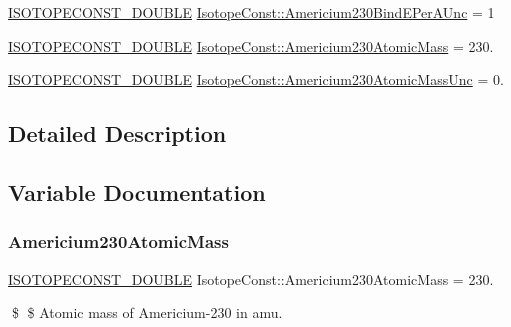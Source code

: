 \begin{DoxyCompactItemize}
\mbox{\hyperlink{group___isotope_const-_macros_ga8f45a7272ce02c0b4c65c44636ed719a}{I\+S\+O\+T\+O\+P\+E\+C\+O\+N\+S\+T\+\_\+\+D\+O\+U\+B\+LE}} \mbox{\hyperlink{group___isotope_const-_americium-_am230_gafda9f33ae4a0af129bb4cdbe074f6c0a}{Isotope\+Const\+::\+Americium230\+Bind\+E\+Per\+A\+Unc}} = 1
\item 
\mbox{\hyperlink{group___isotope_const-_macros_ga8f45a7272ce02c0b4c65c44636ed719a}{I\+S\+O\+T\+O\+P\+E\+C\+O\+N\+S\+T\+\_\+\+D\+O\+U\+B\+LE}} \mbox{\hyperlink{group___isotope_const-_americium-_am230_ga97924e01da5fd2e1b07517b049eb7891}{Isotope\+Const\+::\+Americium230\+Atomic\+Mass}} = 230.
\item 
\mbox{\hyperlink{group___isotope_const-_macros_ga8f45a7272ce02c0b4c65c44636ed719a}{I\+S\+O\+T\+O\+P\+E\+C\+O\+N\+S\+T\+\_\+\+D\+O\+U\+B\+LE}} \mbox{\hyperlink{group___isotope_const-_americium-_am230_gaf288d531519dbaa317557926e11abff8}{Isotope\+Const\+::\+Americium230\+Atomic\+Mass\+Unc}} = 0.
\end{DoxyCompactItemize}


\subsection{Detailed Description}


\subsection{Variable Documentation}
\mbox{\label{group___isotope_const-_americium-_am230_ga97924e01da5fd2e1b07517b049eb7891}} 
\subsubsection{\texorpdfstring{Americium230\+Atomic\+Mass}{Americium230AtomicMass}}
{\footnotesize\ttfamily \mbox{\hyperlink{group___isotope_const-_macros_ga8f45a7272ce02c0b4c65c44636ed719a}{I\+S\+O\+T\+O\+P\+E\+C\+O\+N\+S\+T\+\_\+\+D\+O\+U\+B\+LE}} Isotope\+Const\+::\+Americium230\+Atomic\+Mass = 230.}

\$ \$ Atomic mass of Americium-\/230 in amu. \mbox{\label{group___isotope_const-_americium-_am230_gaf288d531519dbaa317557926e11abff8}} 
